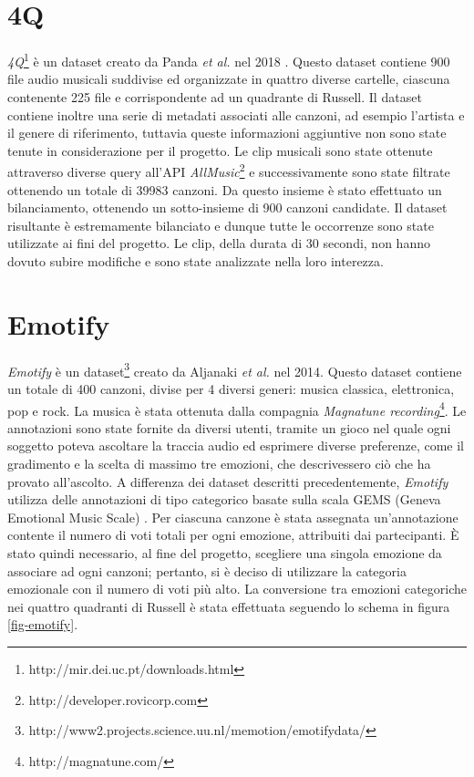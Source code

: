 \documentclass[11pt]{report}
\begin{document}
\section{4Q}
\textit{4Q}\footnote{http://mir.dei.uc.pt/downloads.html} è un dataset creato da Panda \textit{et al.} nel 2018 \cite{panda2018musical}\cite{panda2018novel}. Questo dataset contiene 900 file audio musicali suddivise ed organizzate in quattro diverse cartelle, ciascuna contenente 225 file e corrispondente ad un quadrante di Russell. Il dataset contiene inoltre una serie di metadati associati alle canzoni, ad esempio l'artista e il genere di riferimento, tuttavia queste informazioni aggiuntive non sono state tenute in considerazione per il progetto. Le clip musicali sono state ottenute attraverso diverse query all'API \textit{AllMusic}\footnote{http://developer.rovicorp.com} e successivamente sono state filtrate ottenendo un totale di 39983 canzoni. Da questo insieme è stato effettuato un bilanciamento, ottenendo un sotto-insieme di 900 canzoni candidate. Il dataset risultante è estremamente bilanciato e dunque tutte le occorrenze sono state utilizzate ai fini del progetto. Le clip, della durata di 30 secondi, non hanno dovuto subire modifiche e sono state analizzate nella loro interezza.



\section{Emotify}

\textit{Emotify} è un dataset\footnote{http://www2.projects.science.uu.nl/memotion/emotifydata/} creato da Aljanaki \textit{et al.} nel 2014\cite{aljanaki2014collecting}\cite{aljanaki2016studying}. Questo dataset contiene un totale di 400 canzoni, divise per 4 diversi generi: musica classica, elettronica, pop e rock. La musica è stata ottenuta dalla compagnia \textit{Magnatune recording}\footnote{http://magnatune.com/}. Le annotazioni sono state fornite da diversi utenti, tramite un gioco nel quale ogni soggetto poteva ascoltare la traccia audio ed esprimere diverse preferenze, come il gradimento e la scelta di massimo tre emozioni, che descrivessero ciò che ha provato all'ascolto. A differenza dei dataset descritti precedentemente, \textit{Emotify} utilizza delle annotazioni di tipo categorico basate sulla scala GEMS (Geneva Emotional Music Scale) \cite{zentner2008emotions}. Per ciascuna canzone è stata assegnata un'annotazione contente il numero di voti totali per ogni emozione, attribuiti dai partecipanti. È stato quindi necessario, al fine del progetto, scegliere una singola emozione da associare ad ogni canzoni; pertanto, si è deciso di utilizzare la categoria emozionale con il numero di voti più alto. La conversione tra emozioni categoriche nei quattro quadranti di Russell è stata effettuata seguendo lo schema in figura \ref{fig-emotify}.
\end{document}
